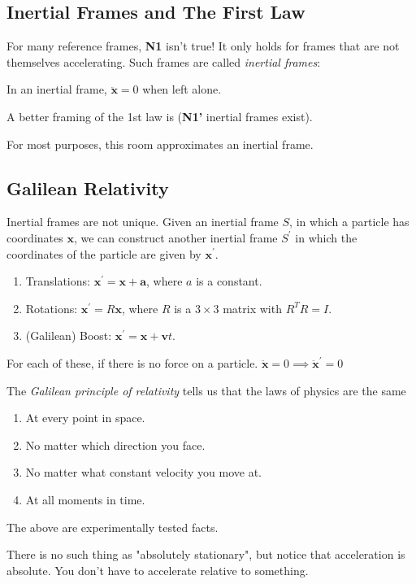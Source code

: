 \subsection{Inertial Frames and The First Law}
For many reference frames, \textbf{N1} isn't true! It only holds for frames that are not themselves accelerating. Such frames are called \textit{inertial frames}:
\begin{definition}
    In an inertial frame, $\ddot{\mathbf{x} }=0$ when left alone.
\end{definition}

A better framing of the 1st law is (\textbf{N1'} inertial frames exist).

For most purposes, this room approximates an inertial frame.

\subsection{Galilean Relativity}
Inertial frames are not unique. Given an inertial frame $S$, in which a particle has coordinates $\mathbf{x} $, we can construct another inertial frame $S^\prime $ in which the coordinates of the particle are given by $\mathbf{x} ^\prime $.
\begin{enumerate}
    \item Translations: $\mathbf{x} ^\prime =\mathbf{x}  + \mathbf{a} $, where $a$ is a constant.
    \item Rotations: $\mathbf{x} ^\prime = R\mathbf{x} $, where $R$ is a $3\times 3$ matrix with $R^{T}R=I$.
    \item (Galilean) Boost: $\mathbf{x}^\prime =\mathbf{x}  + \mathbf{v} t$.
\end{enumerate}

For each of these, if there is no force on a particle.
\(\ddot{\mathbf{x}} = 0 \implies \ddot{\textbf{x}}^\prime =0 \) 

The \textit{Galilean principle of relativity} tells us that the laws of physics are the same
\begin{enumerate}
    \item At every point in space.
    \item No matter which direction you face.
    \item No matter what constant velocity you move at.
    \item At all moments in time.
\end{enumerate}
The above are experimentally tested facts.

There is no such thing as "absolutely stationary", but notice that acceleration is absolute. You don't have to accelerate relative to something.